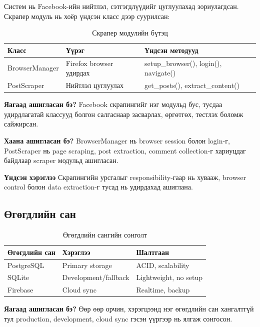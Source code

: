 \documentclass[12pt,a4paper]{report}
\begin{document}
Систем нь Facebook-ийн нийтлэл, сэтгэгдлүүдийг цуглуулахад зориулагдсан. Скрапер модуль нь хоёр үндсэн класс дээр суурилсан:

\begin{table}[H]
\centering
\caption{Скрапер модулийн бүтэц}
\begin{tabular}{|l|l|l|}
\hline
\textbf{Класс} & \textbf{Үүрэг} & \textbf{Үндсэн методууд} \\
\hline
BrowserManager & Firefox browser удирдах & setup\_browser(), login(), navigate() \\
PostScraper & Нийтлэл цуглуулах & get\_posts(), extract\_content() \\
\hline
\end{tabular}
\end{table}


\textbf{Яагаад ашигласан бэ?} Facebook скрапингийг нэг модульд бус, тусдаа удирдлагатай классууд болгон салгаснаар засварлах, өргөтгөх, тестлэх боломж сайжирсан.

\textbf{Хаана ашигласан бэ?} BrowserManager нь browser session болон login-г, PostScraper нь page scraping, post extraction, comment collection-г хариуцдаг байдлаар scraper модульд ашигласан.

\textbf{Үндсэн хэрэглээ} Скрапингийн урсгалыг responsibility-гаар нь хувааж, browser control болон data extraction-г тусад нь удирдахад ашиглана.

\subsection{Өгөгдлийн сан}

\begin{table}[H]
\centering
\caption{Өгөгдлийн сангийн сонголт}
\begin{tabular}{|l|l|l|}
\hline
\textbf{Өгөгдлийн сан} & \textbf{Хэрэглээ} & \textbf{Шалтгаан} \\
\hline
PostgreSQL & Primary storage & ACID, scalability \\
SQLite & Development/fallback & Lightweight, no setup \\
Firebase & Cloud sync & Realtime, backup \\
\hline
\end{tabular}
\end{table}

\textbf{Яагаад ашигласан бэ?} Өөр өөр орчин, хэрэгцээнд нэг өгөгдлийн сан хангалтгүй тул production, development, cloud sync гэсэн үүргээр нь ялгаж сонгосон.
\end{document}
